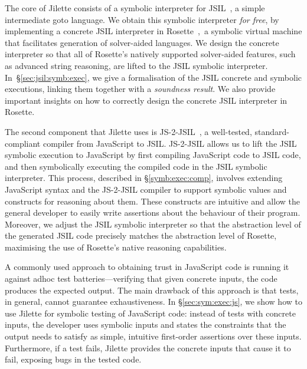\documentclass{llncs}
\newcommand{\jsil}{JSIL\xspace}
\newcommand{\JSComp}{JS-2-JSIL\xspace}
\newcommand{\jilette}{Jilette\xspace}
\newcommand{\myparagraph}[1]{\smallskip\noindent {\bf #1.}\hspace{1pt}}
\begin{document}
\myparagraph{Architecture}
The core of \jilette consists of a symbolic interpreter for
\jsil~\cite{javert}, a simple intermediate goto language. 
We obtain this symbolic interpreter \emph{for free}, 
by implementing a concrete \jsil interpreter in Rosette~\cite{Rosette2,Rosette1},~a 
symbolic virtual machine that facilitates generation of solver-aided languages.
We design the concrete interpreter so that all of Rosette's natively supported solver-aided
features, such as advanced string reasoning, 
are lifted to the \jsil symbolic interpreter. 
In~\S\ref{sec:jsil:symb:exec}, we give a formalisation of the \jsil concrete and symbolic executions, linking them together with a {\em soundness result}. We also provide 
important insights on how to correctly design the concrete \jsil interpreter in Rosette.

The second component that \jilette uses is \JSComp~\cite{javert}, 
a well-tested, standard-compliant compiler from JavaScript to \jsil.
\JSComp allows us to lift the \jsil symbolic execution to JavaScript by first compiling JavaScript code to \jsil code, and
then symbolically executing the compiled code in the 
\jsil symbolic interpreter. This process, described in \S\ref{symb:exec:comp},
involves extending JavaScript syntax and the \JSComp compiler to support symbolic values and 
constructs for reasoning about them. These constructs are intuitive
and allow the general developer to easily write assertions about the behaviour
of their program. 
Moreover, we adjust the \jsil symbolic interpreter so that the abstraction level 
of the generated \jsil code precisely matches the abstraction level of Rosette, 
 maximising the use of Rosette's native reasoning capabilities.



\myparagraph{Application: Symbolic Testing} A commonly used 
approach to obtaining trust in JavaScript code is running it against 
adhoc test batteries---verifying that given concrete inputs, the code produces the expected
output. The main drawback of this approach is that tests, in general,
cannot guarantee exhaustiveness. %
In \S\ref{sec:sym:exec:js}, we show how to use \jilette
for symbolic testing of JavaScript code: instead of 
tests with concrete 
inputs, the developer uses symbolic inputs and states the 
constraints that the output needs to satisfy as simple, intuitive 
first-order assertions over these inputs. 
Furthermore, if a test fails, Jilette provides the concrete inputs that cause it 
to fail, exposing bugs in the tested code. 
\end{document}
